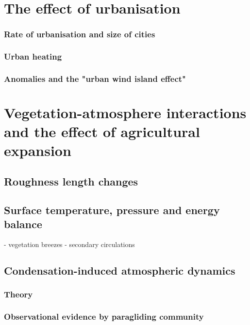 \section{The effect of urbanisation}

\subsubsection{Rate of urbanisation and size of cities}

\subsubsection{Urban heating}

\subsubsection{Anomalies and the "urban wind island effect"}

\section[Vegetation-atmosphere interactions]{Vegetation-atmosphere interactions and the effect of agricultural expansion}

\subsection{Roughness length changes}

\subsection{Surface temperature, pressure and energy balance}

- vegetation breezes
- secondary circulations

\subsection{Condensation-induced atmospheric dynamics}

\subsubsection{Theory}

\subsubsection{Observational evidence by paragliding community}

